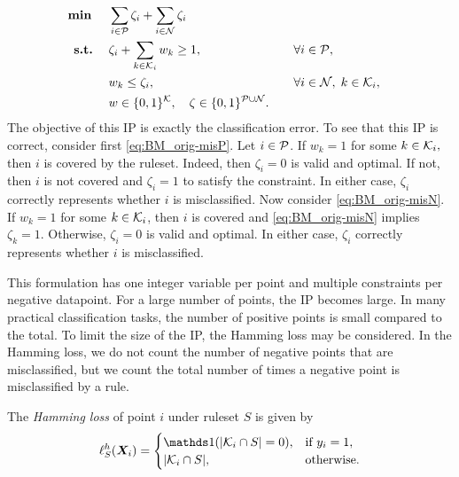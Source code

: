 \begin{subequations}
    \label{eq:BM_orig}
    \begin{align}
        \mathbf{\min} \quad & \sum_{i \in \cP} \zeta_i + \sum_{i \in \cN} \zeta_i \label{eq:BM_orig-obj} \\
        \st \quad & \zeta_i + \sum_{k \in \K_i} w_k \geq 1, && \forall i \in \cP, \label{eq:BM_orig-misP} \\
        & w_k \leq \zeta_i, && \forall i \in \cN,\; k \in \K_i, \label{eq:BM_orig-misN} \\
        & w \in \{0, 1\}^{\K}, \quad \zeta \in \{0, 1\}^{\cP \cup \cN}. \quad && \label{eq:BM_orig-vars}
    \end{align}
\end{subequations}
The objective of this IP is exactly the \zo classification error.
To see that this IP is correct, consider first \eqref{eq:BM_orig-misP}.
Let $i \in \P$.
If $w_k = 1$ for some $k \in \K_i,$ then $i$ is covered by the ruleset.
Indeed, then $\zeta_i=0$ is valid and optimal.
If not, then $i$ is not covered and $\zeta_i = 1$ to satisfy the constraint.
In either case, $\zeta_i$ correctly represents whether $i$ is misclassified.
Now consider \eqref{eq:BM_orig-misN}.
If $w_k = 1$ for some $k \in \K_i$, then $i$ is covered and \eqref{eq:BM_orig-misN} implies $\zeta_k = 1$.
Otherwise, $\zeta_i =0$ is valid and optimal.
In either case, $\zeta_i$ correctly represents whether $i$ is misclassified.


This formulation has one integer variable per point and multiple constraints per negative datapoint.
For a large number of points, the IP becomes large.
In many practical classification tasks, the number of positive points is small compared to the total.
To limit the size of the IP, the Hamming loss may be considered.
In the Hamming loss, we do not count the number of negative points that are misclassified, but we count
the total number of times a negative point is misclassified by a rule.

\begin{definition} The \emph{Hamming loss} of point $i$ under ruleset $S$ is given by
\[\ell^{h}_S(\bm{X}_i) =
\begin{cases}
    \Ind(\abs{\K_i \cap S }= 0), & \text{if } y_i = 1,\\
    \abs{\K_i \cap S}, &\text{otherwise.}
\end{cases}\]
\end{definition}

